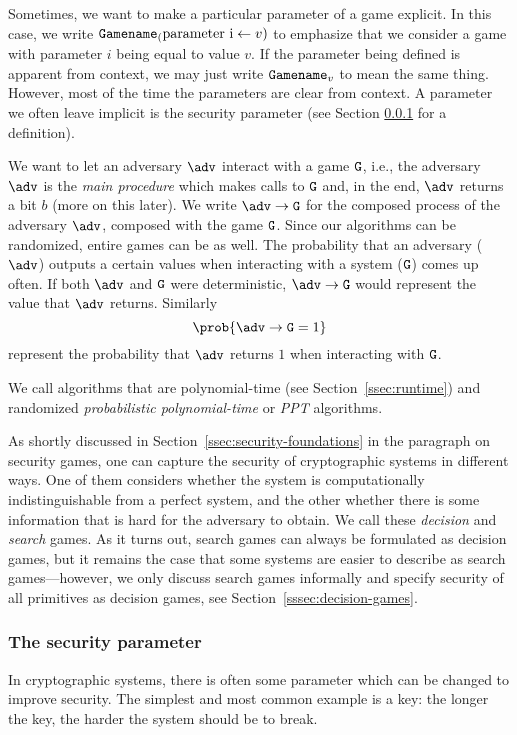 Sometimes, we want to make a particular parameter of a game explicit. In this case, we write $\text{\texttt{Gamename}}_(\text{parameter i}\gets{v})$ to emphasize that we consider a game with parameter $i$ being equal to value $v$. If the parameter being defined is apparent from context, we may just write $\text{\texttt{Gamename}}_v$ to mean the same thing. However, most of the time the parameters are clear from context. A parameter we often leave implicit is the security parameter (see Section \ref{sssec:security-parameter} for a definition).

We want to let an adversary $\adv$ interact with a game $\text{\texttt{G}}$, i.e., the adversary $\adv$ is the \emph{main procedure} which makes calls to $\text{\texttt{G}}$ and, in the end, $\adv$ returns a bit $b$ (more on this later). We write $\adv\rightarrow\M{G}$ for the composed process of the adversary $\adv$, composed with the game $\text{\texttt{G}}$.
Since our algorithms can be randomized, entire games can be as well. The probability that an adversary ($\adv$) outputs a certain values when interacting with a system ($\text{\texttt{G}}$) comes up often. If both $\adv$ and $\text{\texttt{G}}$ were deterministic, $\adv \circ \M{G}$ would represent the value that $\adv$ returns. Similarly
\[\prob{\adv \circ \M{G} = 1}\]
represent the probability that $\adv$ returns $1$ when interacting with $\text{\texttt{G}}$.

We call algorithms that are polynomial-time (see Section~\ref{ssec:runtime}) and randomized \emph{probabilistic polynomial-time} or \emph{PPT} algorithms.

As shortly discussed in Section~\ref{ssec:security-foundations} in the paragraph on security games, one can capture the security of cryptographic systems in different ways. One of them considers whether the system is computationally indistinguishable from a perfect system, and the other whether there is some information that is hard for the adversary to obtain. We call these \emph{decision} and \emph{search} games. As it turns out, search games can always be formulated as decision games, but it remains the case that some systems are easier to describe as search games---however, we only discuss search games informally and specify security of all primitives as decision games, see Section~\ref{sssec:decision-games}.

\subsubsection{The security parameter}\label{sssec:security-parameter}
In cryptographic systems, there is often some parameter which can be changed to improve security. The simplest and most common example is a key: the longer the key, the harder the system should be to break.

